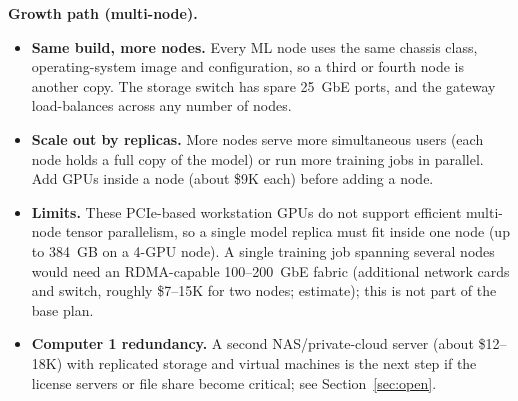 \textbf{Growth path (multi-node).}
\begin{itemize}
  \item \textbf{Same build, more nodes.} Every ML node uses the same chassis class,
    operating-system image and configuration, so a third or fourth node is another
    copy. The storage switch has spare 25~GbE ports, and the gateway load-balances
    across any number of nodes.
  \item \textbf{Scale out by replicas.} More nodes serve more simultaneous users
    (each node holds a full copy of the model) or run more training jobs in
    parallel. Add GPUs inside a node (about \$9K each) before adding a node.
  \item \textbf{Limits.} These PCIe-based workstation GPUs do not support
    efficient multi-node tensor parallelism, so a single model replica must fit
    inside one node (up to 384~GB on a 4-GPU node). A single training job spanning
    several nodes would need an RDMA-capable 100--200~GbE fabric (additional
    network cards and switch, roughly \$7--15K for two nodes; estimate); this is
    not part of the base plan.
  \item \textbf{Computer 1 redundancy.} A second NAS/private-cloud server (about
    \$12--18K) with replicated storage and virtual machines is the next step if
    the license servers or file share become critical; see Section~\ref{sec:open}.
\end{itemize}

